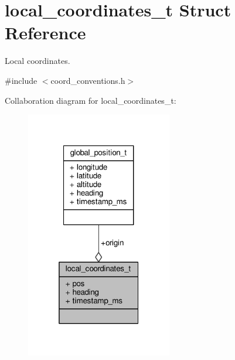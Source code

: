 \hypertarget{structlocal__coordinates__t}{\section{local\+\_\+coordinates\+\_\+t Struct Reference}
\label{structlocal__coordinates__t}
}


Local coordinates.  




{\ttfamily \#include $<$coord\+\_\+conventions.\+h$>$}



Collaboration diagram for local\+\_\+coordinates\+\_\+t\+:
\nopagebreak
\begin{figure}[H]
\begin{center}
\leavevmode
\includegraphics[width=181pt]{structlocal__coordinates__t__coll__graph}
\end{center}
\end{figure}
